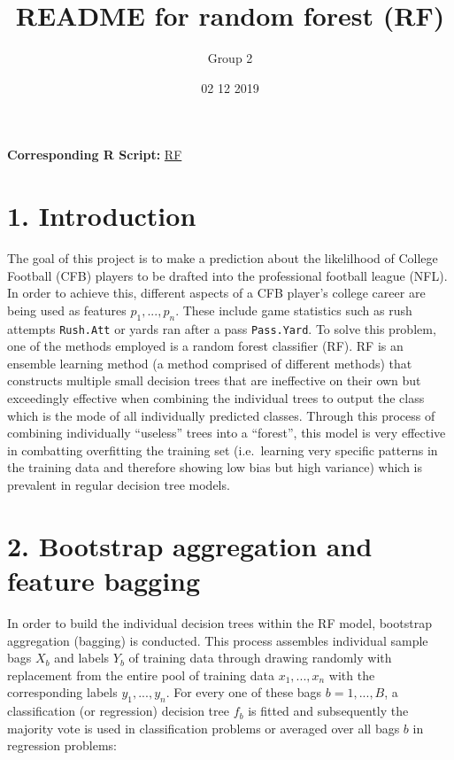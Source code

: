 \documentclass[]{article}
\title{README for random forest (RF)}
\author{Group 2}
\date{02 12 2019}
\begin{document}
\maketitle

\textbf{Corresponding R Script:}
\href{https://github.com/NicSchuler/DSF_NFLDraftPrediction/blob/master/Project_Scripts/RandomForest.R}{RF}

\hypertarget{introduction}{%
\section{1. Introduction}\label{introduction}}

The goal of this project is to make a prediction about the likelilhood
of College Football (CFB) players to be drafted into the professional
football league (NFL). In order to achieve this, different aspects of a
CFB player's college career are being used as features
\(p_{1}, ..., p_{n}\). These include game statistics such as rush
attempts \texttt{Rush.Att} or yards ran after a pass \texttt{Pass.Yard}.
To solve this problem, one of the methods employed is a random forest
classifier (RF). RF is an ensemble learning method (a method comprised
of different methods) that constructs multiple small decision trees that
are ineffective on their own but exceedingly effective when combining
the individual trees to output the class which is the mode of all
individually predicted classes. Through this process of combining
individually ``useless'' trees into a ``forest'', this model is very
effective in combatting overfitting the training set (i.e.~learning very
specific patterns in the training data and therefore showing low bias
but high variance) which is prevalent in regular decision tree models.

\hypertarget{bootstrap-aggregation-and-feature-bagging}{%
\section{2. Bootstrap aggregation and feature
bagging}\label{bootstrap-aggregation-and-feature-bagging}}

In order to build the individual decision trees within the RF model,
bootstrap aggregation (bagging) is conducted. This process assembles
individual sample bags \(X_{b}\) and labels \(Y_{b}\) of training data
through drawing randomly with replacement from the entire pool of
training data \(x_{1},...,x_{n}\) with the corresponding labels
\(y_{1},...,y_{n}\). For every one of these bags \(b=1,...,B\), a
classification (or regression) decision tree \(f_{b}\) is fitted and
subsequently the majority vote is used in classification problems or
averaged over all bags \(b\) in regression problems:
\end{document}

